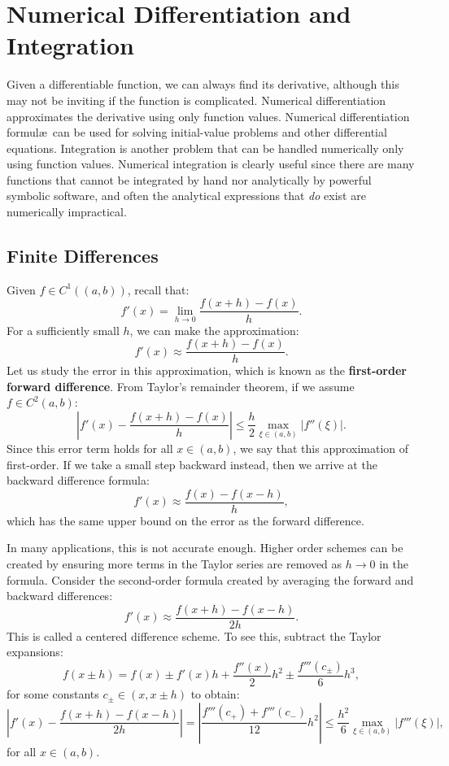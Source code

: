 \chapter{Numerical Differentiation and Integration}\label{chapter:Calculus}

Given a differentiable function, we can always find its derivative, although this may not be inviting if the function is complicated. Numerical differentiation approximates the derivative using only function values. Numerical differentiation formul\ae~can be used for solving initial-value problems and other differential equations. Integration is another problem that can be handled numerically only using function values. Numerical integration is clearly useful since there are many functions that cannot be integrated by hand nor analytically by powerful symbolic software, and often the analytical expressions that {\em do} exist are numerically impractical.

\section{Finite Differences}

Given $f\in C^1((a,b))$, recall that:
\[
f'(x) = \lim_{h\to0}\dfrac{f(x+h)-f(x)}{h}.
\]
For a sufficiently small $h$, we can make the approximation:
\[
f'(x) \approx \dfrac{f(x+h)-f(x)}{h}.
\]
Let us study the error in this approximation, which is known as the {\bf first-order forward difference}. From Taylor's remainder theorem, if we assume $f\in C^2(a,b)$:
\[
\left|f'(x) - \dfrac{f(x+h)-f(x)}{h}\right| \le \dfrac{h}{2}\max_{\xi\in(a,b)}|f''(\xi)|.
\]
Since this error term holds for all $x\in(a,b)$, we say that this approximation of first-order. If we take a small step backward instead, then we arrive at the backward difference formula:
\[
f'(x) \approx \dfrac{f(x)-f(x-h)}{h},
\]
which has the same upper bound on the error as the forward difference.

In many applications, this is not accurate enough. Higher order schemes can be created by ensuring more terms in the Taylor series are removed as $h\to0$ in the formula. Consider the second-order formula created by averaging the forward and backward differences:
\[
f'(x) \approx \dfrac{f(x+h)-f(x-h)}{2h}.
\]
This is called a centered difference scheme. To see this, subtract the Taylor expansions:
\[
f(x\pm h) = f(x) \pm f'(x)h + \dfrac{f''(x)}{2}h^2 \pm \dfrac{f'''(c_\pm)}{6}h^3,
\]
for some constants $c_\pm\in(x,x\pm h)$ to obtain:
\[
\left|f'(x) - \dfrac{f(x+h)-f(x-h)}{2h}\right| = \left|\dfrac{f'''(c_+) + f'''(c_-)}{12}h^2\right| \le \dfrac{h^2}{6}\max_{\xi\in(a,b)}|f'''(\xi)|,
\]
for all $x\in(a,b)$.

